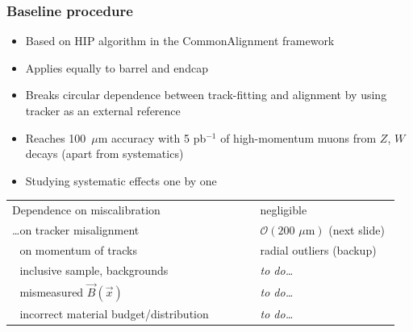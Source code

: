 \documentclass[compress]{beamer}
\begin{document}
\begin{frame}
\frametitle{Baseline procedure}

\vspace{-0.25 cm}
\begin{itemize}\setlength{\itemsep}{0.1 cm}
\item Based on HIP algorithm in the CommonAlignment framework
\item Applies equally to barrel and endcap
\item Breaks circular dependence between track-fitting and alignment by
using tracker as an external reference
\item Reaches 100~$\mu$m accuracy with 5 pb$^{-1}$ of high-momentum muons from $Z$, $W$ decays (apart from systematics)
\item Studying systematic effects one by one
\end{itemize}

\begin{tabular}{p{0.62\linewidth} p{0.35\linewidth}}
Dependence on miscalibration & negligible \\
\ldots on tracker misalignment & $\mathcal{O}(\mbox{200 $\mu$m})$ (next slide) \\
\textcolor{white}{\ldots}on momentum of tracks & radial outliers (backup) \\
\textcolor{white}{\ldots}inclusive sample, backgrounds & \hspace{0.25 cm} {\it to do\ldots} \\
\textcolor{white}{\ldots}mismeasured $\vec{B}(\vec{x})$ & \hspace{0.25 cm} {\it to do\ldots} \\
\textcolor{white}{\ldots}incorrect material budget/distribution & \hspace{0.25 cm} {\it to do\ldots}
\end{tabular}
\end{frame}
\end{document}
